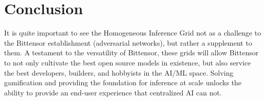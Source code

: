 \documentclass[12pt]{article}
\begin{document}
\section{Conclusion}
It is quite important to see the Homogeneous Inference Grid not as a challenge to the Bittensor establishment (adversarial networks), but rather a supplement to them. A testament to the versatility of Bittensor, these grids will allow Bittensor to not only cultivate the best open source models in existence, but also service the best developers, builders, and hobbyists in the AI/ML space. Solving gamification and providing the foundation for inference at scale unlocks the ability to provide an end-user experience that centralized AI can not. 
\end{document}
